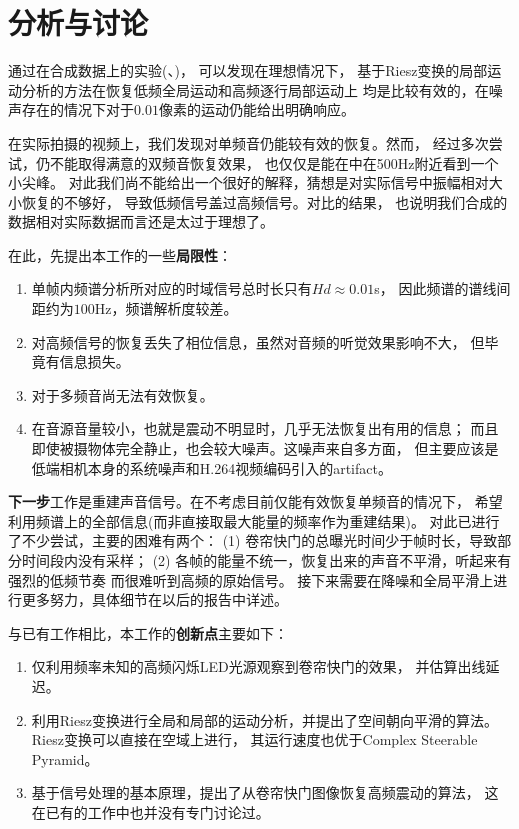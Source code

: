 
\section{分析与讨论}
通过在合成数据上的实验(、)，
可以发现在理想情况下，
基于Riesz变换的局部运动分析的方法在恢复低频全局运动和高频逐行局部运动上
均是比较有效的，在噪声存在的情况下对于$0.01$像素的运动仍能给出明确响应。

在实际拍摄的视频上，我们发现对单频音仍能较有效的恢复。然而，
经过多次尝试，仍不能取得满意的双频音恢复效果，
也仅仅是能在中在500Hz附近看到一个小尖峰。
对此我们尚不能给出一个很好的解释，猜想是对实际信号中振幅相对大小恢复的不够好，
导致低频信号盖过高频信号。对比的结果，
也说明我们合成的数据相对实际数据而言还是太过于理想了。

在此，先提出本工作的一些{\bf 局限性}：
\begin{enumerate}
    \item 单帧内频谱分析所对应的时域信号总时长只有$Hd \approx 0.01$s，
        因此频谱的谱线间距约为$100$Hz，频谱解析度较差。
    \item 对高频信号的恢复丢失了相位信息，虽然对音频的听觉效果影响不大，
        但毕竟有信息损失。
    \item 对于多频音尚无法有效恢复。
    \item 在音源音量较小，也就是震动不明显时，几乎无法恢复出有用的信息；
        而且即使被摄物体完全静止，也会较大噪声。这噪声来自多方面，
        但主要应该是低端相机本身的系统噪声和H.264视频编码引入的artifact。
\end{enumerate}

{\bf 下一步}工作是重建声音信号。在不考虑目前仅能有效恢复单频音的情况下，
希望利用频谱上的全部信息(而非直接取最大能量的频率作为重建结果)。
对此已进行了不少尝试，主要的困难有两个：
(1) 卷帘快门的总曝光时间少于帧时长，导致部分时间段内没有采样；
(2) 各帧的能量不统一，恢复出来的声音不平滑，听起来有强烈的低频节奏
而很难听到高频的原始信号。
接下来需要在降噪和全局平滑上进行更多努力，具体细节在以后的报告中详述。

与已有工作相比，本工作的{\bf 创新点}主要如下：
\begin{enumerate}
    \item 仅利用频率未知的高频闪烁LED光源观察到卷帘快门的效果，
        并估算出线延迟。
    \item 利用Riesz变换进行全局和局部的运动分析，并提出了空间朝向平滑的算法。
        Riesz变换可以直接在空域上进行，
        其运行速度也优于Complex Steerable Pyramid。
    \item 基于信号处理的基本原理，提出了从卷帘快门图像恢复高频震动的算法，
        这在已有的工作中也并没有专门讨论过。
\end{enumerate}

